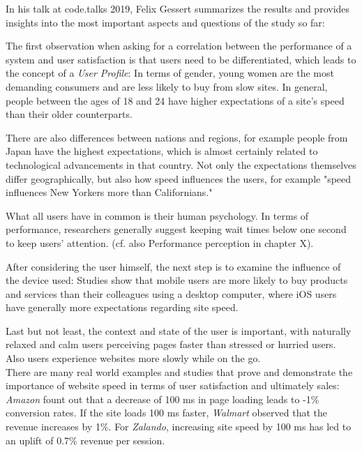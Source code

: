 In his talk at code.talks 2019, Felix Gessert summarizes the results and provides insights into the most important aspects and questions of the study so far: %

The first observation when asking for a correlation between the performance of a system and user satisfaction is that users need to be differentiated, which leads to the concept of a \textit{User Profile}: In terms of gender, young women are the most demanding consumers and are less likely to buy from slow sites.
In general, people between the ages of 18 and 24 have higher expectations of a site's speed than their older counterparts.

There are also differences between nations and regions, for example people from Japan have the highest expectations, which is almost certainly related to technological advancements in that country.
Not only the expectations themselves differ geographically, but also how speed influences the users, for example "speed influences New Yorkers more than Californians."

What all users have in common is their human psychology. 
In terms of performance, researchers generally suggest keeping wait times below one second to keep users' attention. (cf. also Performance perception in chapter X). 

After considering the user himself, the next step is to examine the influence of the device used: Studies show that mobile users are more likely to buy products and services than their colleagues using a desktop computer, where iOS users have generally more expectations regarding site speed.
 
Last but not least, the context and state of the user is important, with naturally relaxed and calm users perceiving pages faster than stressed or hurried users.
Also users experience websites more slowly while on the go.  %
\\

There are many real world examples and studies that prove and demonstrate the importance of website speed in terms of user satisfaction and ultimately sales:
\textit{Amazon} fount out that a decrease of 100 ms in page loading leads to -1\% conversion rates.
If the site loads 100 ms faster, \textit{Walmart} observed that the revenue increases by 1\%.
For \textit{Zalando}, increasing site speed by 100 ms has led to an uplift of 0.7\% revenue per session.

